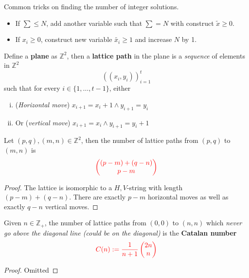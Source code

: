 \documentclass{article}
\def\Z{{\mathbb Z}}
\newcommand{\bi}[2]{\begin{pmatrix}{#1}\\{#2}\end{pmatrix}}
\begin{document}
			\begin{remark}
				Common tricks on finding the number of integer solutions.
				\begin{itemize}
					\item If $\sum \leq N$, add another variable such that $\sum = N$ with construct $\tilde{x} \geq 0$.
					\item If $x_i \geq 0$, construct new variable $\tilde{x_i} \geq 1$ and increase $N$ by 1.
				\end{itemize} 
			\end{remark}
			
		\begin{definition}
			Define a \textbf{plane} as $\Z^2$, then a \textbf{lattice path} in the plane is a \emph{sequence} of elements in $\Z^2$
			\begin{equation}
				((x_i, y_i))_{i=1}^t
			\end{equation}
			such that for every $i \in \{1,\dots,t-1\}$, either
			\begin{enumerate}[(i)]
				\item (\emph{Horizontal move}) $x_{i+1} = x_i + 1 \land y_{i+1} = y_i$
				\item Or (\emph{vertical move}) $x_{i+1} = x_i \land y_{i+1} = y_i + 1$
			\end{enumerate}
		\end{definition}
		
		\begin{lemma}
			Let $(p, q), (m, n) \in \Z^2$, then the number of lattice paths from $(p, q)$ to $(m, n)$ is 
			\begin{equation}
				\red{\bi{(p-m) + (q-n)}{p-m}}
			\end{equation}
			\begin{proof}
				The lattice is isomorphic to a ${H, V}$-string with length $(p-m)+(q-n)$. There are exactly $p-m$ horizontal moves as well as exactly $q-n$ vertical moves.
			\end{proof}
		\end{lemma}
		
		\begin{theorem}
			Given $n \in \Z_+$, the number of lattice paths from $(0,0)$ to $(n, n)$ which \emph{never go above the diagonal line (could be on the diagonal)} is the \textbf{Catalan number}
			\begin{equation}
				\red{C(n) := \frac{1}{n+1} \bi{2n}{n}}
			\end{equation}
			\begin{proof}
				Omitted
			\end{proof}
		\end{theorem}
		
\end{document}
